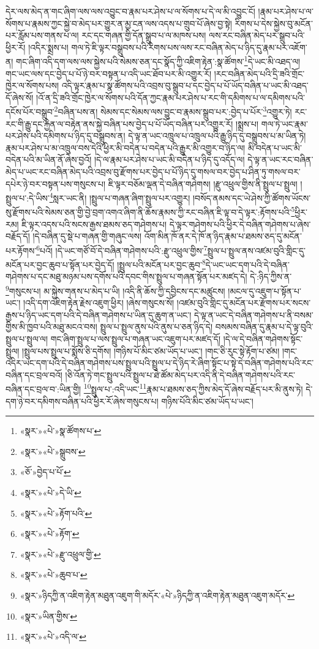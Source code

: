 དེར་ལས་མེད་ན་གང་ཞིག་ལས་ལས་འབྱུང་བ་རྣམ་པར་ཤེས་པ་ལ་སོགས་པ་དེ་ལ་མི་འབྱུང་ངོ། །རྣམ་པར་ཤེས་པ་ལ་སོགས་པ་རྣམས་ཀྱང་སྐྱེ་བ་མེད་པར་གྱུར་ན་མྱ་ངན་ལས་འདས་པ་གྲུབ་པོ་ཞེས་བྱ་སྟེ། རིགས་པ་དེས་སྐྱེས་བུ་མངོན་པར་རློམ་པས་གནས་པ་ལ། རང་དང་གཞན་གྱི་དོན་སྒྲུབ་པ་ལ་མཁས་པས། ལས་རང་བཞིན་མེད་པར་སྒྲུབ་པའི་ཕྱིར་རོ། །འདིར་སྨྲས་པ། གལ་ཏེ་ཇི་ལྟར་བསྒྲུབས་པའི་རིགས་པས་ལས་རང་བཞིན་མེད་པ་ཉིད་དུ་རྣམ་པར་འཇོག་ན། གང་ཞིག་འདི་དག་ལས་ལས་སྐྱེས་པའི་སེམས་ཅན་དང་སྣོད་ཀྱི་འཇིག་རྟེན་:སྣ་ཚོགས་\footnote{«སྣར་»«པེ་»སྣ་ཚོགས་པ་}དེ་ཡང་མི་འཐད་ལ། གང་ཡང་ལས་དང་བྱེད་པ་པོ་ཉེ་བར་བསྟན་པ་འདི་ཡང་ཐོབ་པར་མི་འགྱུར་རོ། །རང་བཞིན་མེད་པའི་དྲི་ཟའི་གྲོང་ཁྱེར་ལ་སོགས་པས། འདི་ལྟར་རྣམ་པ་སྣ་ཚོགས་པའི་འབྲས་བུ་སྒྲུབ་པ་དང་བྱེད་པ་པོ་ཡོད་བཞིན་པ་ཡང་མི་འཐད་དོ་ཞེས་སོ། །འོ་ན་དྲི་ཟའི་གྲོང་ཁྱེར་ལ་སོགས་པའི་དོན་ཀྱང་རྣམ་པར་ཤེས་པ་རང་གི་དམིགས་པ་ལ་དམིགས་པའི་དངོས་པོར་བསྒྲུབ་\footnote{«སྣར་»«པེ་»སྒྲུབས་}བཞིན་པས་ན། སེམས་དང་སེམས་ལས་བྱུང་བ་རྣམས་སྒྲུབ་པར་:བྱེད་པ་པོར་\footnote{«ཅོ་»བྱེད་པ་པོ་}འགྱུར་ཏེ། རང་རང་གི་རྒྱུ་དང་རྐྱེན་ལ་བརྟེན་ནས་སྐྱེ་བཞིན་པས་བྱེད་པ་པོ་ཡོད་བཞིན་པར་འགྱུར་རོ། །སྨྲས་པ། གལ་ཏེ་ཡང་རྣམ་པར་ཤེས་པའི་དམིགས་པ་ཉིད་དུ་བསྒྲུབས་ན། དེ་ལྟ་ན་ཡང་འཁྲུལ་པ་འཁྲུལ་པའི་རྒྱུ་ཉིད་དུ་བསྒྲུབས་པ་མ་ཡིན་ཏེ། རྣམ་པར་ཤེས་པ་མ་འཁྲུལ་བས་དེའི་ཕྱིར་མི་བདེན་པ་བདེན་པའི་རྒྱུར་མི་འགྱུར་བ་ཉིད་ལ། མི་བདེན་པ་ཡང་མི་བདེན་པའི་མ་ཡིན་ནོ་ཞེས་བྱའོ། །དེ་ལ་རྣམ་པར་ཤེས་པ་ཡང་མི་བདེན་པ་ཉིད་དུ་འདོད་ལ། དེ་ལྟ་ན་ཡང་རང་བཞིན་མེད་པ་ཡང་རང་བཞིན་མེད་པའི་འབྲས་བུ་རྫོགས་པར་བྱེད་པ་པོ་ཉིད་དུ་གསལ་བར་བྱེད་པ་ཤིན་ཏུ་གསལ་བར་དཔེར་ཉེ་བར་བསྟན་པས་གསུངས་པ། ཇི་ལྟར་བཅོམ་ལྡན་དེ་བཞིན་གཤེགས། །རྫུ་འཕྲུལ་གྱིས་ནི་སྤྲུལ་པ་སྤྲུལ། །སྤྲུལ་པ་:དེ་ཡིས་\footnote{«སྣར་»«པེ་»དེ་ཡི་}སླར་ཡང་ནི། །སྤྲུལ་པ་གཞན་ཞིག་སྤྲུལ་པར་འགྱུར། །བསོད་ནམས་དང་ཡེ་ཤེས་ཀྱི་ཚོགས་ཡོངས་སུ་རྫོགས་པའི་སེམས་ཅན་གྱི་བྱེ་བྲག་འགའ་ཞིག་ནི་ཆོས་རྣམས་ཀྱི་རང་བཞིན་ཇི་ལྟ་བ་དེ་ལྟར་:རྟོགས་པའི་\footnote{«སྣར་»«པེ་»རྟོག་པའི་}ཕྱིར་རམ། ཇི་ལྟར་འདས་པའི་སངས་རྒྱས་ཐམས་ཅད་གཤེགས་པ། དེ་ལྟར་གཤེགས་པའི་ཕྱིར་དེ་བཞིན་གཤེགས་པ་ཞེས་བརྗོད་དོ། །དེ་བཞིན་དུ་སྡེ་པ་གཞན་གྱི་གཞུང་ལས། འོག་མིན་ཁོ་ནར་དེ་ཁོ་ན་ཉིད་རྣམ་པ་ཐམས་ཅད་དུ་མངོན་པར་རྟོགས་\footnote{«སྣར་»«པེ་»རྟོག་}པའོ། །དེ་ཡང་གཙོ་བོ་དེ་བཞིན་གཤེགས་པའི་:རྫུ་འཕྲུལ་གྱིས་\footnote{«སྣར་»«པེ་»རྫུ་འཕྲུལ་གྱི་}སྤྲུལ་པ་སྤྲུལ་ནས་འཛམ་བུའི་གླིང་དུ་མངོན་པར་བྱང་ཆུབ་པ་སྟོན་པར་བྱེད་དོ། །སྤྲུལ་པའི་མངོན་པར་བྱང་ཆུབ་\footnote{«སྣར་»«པེ་»ཆུབ་པ་}དེ་ཡང་ཡང་དག་པའི་དེ་བཞིན་གཤེགས་པ་དང་མཐུ་མཉམ་པས་དགོས་པའི་དབང་གིས་སྤྲུལ་པ་གཞན་སྟོན་པར་མཛད་དེ། དེ་:ཉིད་ཀྱིས་ན་\footnote{«སྣར་»ཉིདཀྱི་ན་འཇིག་རྟེན་མཐུན་འཇུག་གི་མདོར་«པེ་»ཉིདཀྱི་ན་འཇིག་རྟེན་མཐུན་འཇུག་མདོར་}གསུངས་པ། མ་སྐྱེས་གནས་པ་མེད་པ་ཡི། །འདི་ནི་ཆོས་ཀྱི་དབྱིངས་དང་མཚུངས། །མངལ་དུ་འཇུག་པ་སྟོན་པ་ཡང་། །འདི་དག་འཇིག་རྟེན་རྗེས་འཇུག་ཕྱིར། །ཞེས་གསུངས་སོ། །འཛམ་བུའི་གླིང་དུ་མངོན་པར་རྫོགས་པར་སངས་རྒྱས་པ་ཉིད་ཡང་དག་པའི་དེ་བཞིན་གཤེགས་པ་ཡིན་དུ་ཆུག་ན་ཡང་། དེ་ལྟ་ན་ཡང་དེ་བཞིན་གཤེགས་པ་ནི་བསམ་གྱིས་མི་ཁྱབ་པའི་མཐུ་མངའ་བས། སྤྲུལ་པ་སྤྲུལ་ནུས་པའི་ནུས་པ་ཅན་ཉིད་དེ། བསམས་བཞིན་དུ་རྣམ་པ་དེ་ལྟ་བུའི་སྤྲུལ་པ་སྤྲུལ་ལ། གང་ཞིག་སྤྲུལ་པ་ལས་སྤྲུལ་པ་གཞན་ཡང་འཇུག་པར་མཛད་དོ། །དེ་ལ་དེ་བཞིན་གཤེགས་སྟོང་སྤྲུལ། །སྤྲུལ་པས་སྤྲུལ་པ་སྨོས་ཅི་དགོས། །གཉིས་པོ་མིང་ཙམ་ཡོད་པ་ཡང་། །གང་ཅི་རུང་སྟེ་རྟོག་པ་ཙམ། །གང་འདིར་ཡང་དག་པའི་དེ་བཞིན་གཤེགས་པས་སྤྲུལ་པའི་སྤྲུལ་པ་དེ་ཉིད་རེ་ཞིག་སྟོང་པ་སྟེ་དེ་བཞིན་གཤེགས་པའི་རང་བཞིན་དང་བྲལ་བའོ། །ཅི་འོན་ཏེ་གང་སྤྲུལ་པའི་སྤྲུལ་པ་ཐེ་ཚོམ་མེད་པར་འདི་ནི་དེ་བཞིན་གཤེགས་པའི་རང་བཞིན་དང་བྲལ་བ་:ཡིན་གྱི། \footnote{«སྣར་»ཡིན་གྱིས་}སྤྲུལ་པ་:འདི་ཡང་\footnote{«སྣར་»«པེ་»འདི་ལ་}རྣམ་པ་ཐམས་ཅད་ཀྱིས་མེད་དོ་ཞེས་བརྗོད་པར་མི་ནུས་ཏེ། དེ་དག་ཉེ་བར་དམིགས་བཞིན་པའི་ཕྱིར་རོ་ཞེས་གསུངས་པ། གཉིས་པོའི་མིང་ཙམ་ཡོད་པ་ཡང་། 